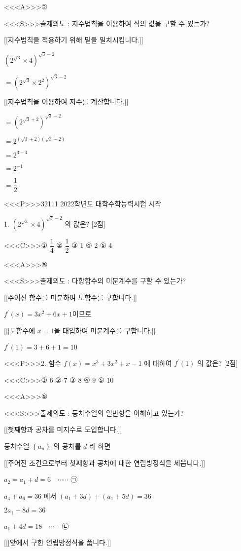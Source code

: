 \documentclass{oblivoir}
\begin{document}
<<<A>>>②

<<<S>>>출제의도 : 지수법칙을 이용하여 식의 값을 구할 수 있는가?

[[지수법칙을 적용하기 위해 밑을 일치시킵니다.]]

$\left(2^{\sqrt{3}} \times 4\right)^{\sqrt{3}-2}$

$=\left(2^{\sqrt{3}} \times 2^{2}\right)^{\sqrt{3}-2}$

[[지수법칙을 이용하여 지수를 계산합니다.]]

$=\left(2^{\sqrt{3}+2}\right)^{\sqrt{3}-2}$

$=2^{(\sqrt{3}+2)(\sqrt{3}-2)}$

$=2^{3-4}$

$=2^{-1}$

$=\dfrac{1}{2}$

<<<P>>>32111 2022학년도 대학수학능력시험 시작

1. $\left(2^{\sqrt{3}} \times 4\right)^{\sqrt{3}-2}$ 의 값은? [2점]

<<<C>>>① $\dfrac{1}{4}$
② $\dfrac{1}{2}$
③ $1$
④ $2$
⑤ $4$


<<<A>>>⑤

<<<S>>>출제의도 : 다항함수의 미분계수를 구할 수 있는가?

[[주어진 함수를 미분하여 도함수를 구합니다.]]

$f^{\prime}(x)=3 x^{2}+6 x+1$이므로

[[[도함수에 $x=1$을 대입하여 미분계수를 구합니다.]]

$f^{\prime}(1)=3+6+1=10$

<<<P>>>2. 함수 $f(x)=x^{3}+3 x^{2}+x-1$ 에 대하여 $f^{\prime}(1)$ 의 값은? [2점]

<<<C>>>① $6$
② $7$
③ $8$
④ $9$
⑤ $10$

<<<A>>>⑤

<<<S>>>출제의도 : 등차수열의 일반항을 이해하고 있는가?

[[첫째항과 공차를 미지수로 도입합니다.]]

등차수열 $\left\{a_{n}\right\}$ 의 공차를 $d$ 라 하면

[[주어진 조건으로부터 첫째항과 공차에 대한 연립방정식을 세웁니다.]]

$a_{2}=a_{1}+d=6 \quad \cdots \cdots$ ㉠

$a_{4}+a_{6}=36$ 에서
$\left(a_{1}+3 d\right)+\left(a_{1}+5 d\right)=36$

$2 a_{1}+8 d=36$

$a_{1}+4 d=18 \quad \cdots \cdots$ ㉡

[[[앞에서 구한 연립방정식을 풉니다.]]
\end{document}

